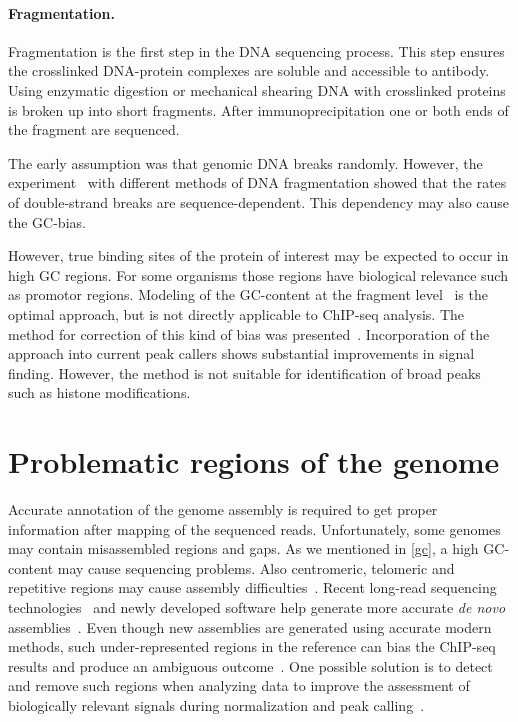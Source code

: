 \paragraph{Fragmentation.}
Fragmentation is the first step in the DNA sequencing process.
This step ensures the crosslinked DNA-protein complexes are soluble and accessible to antibody.
Using enzymatic digestion or mechanical shearing DNA with crosslinked proteins is broken up into short fragments.
After immunoprecipitation one or both ends of the fragment are sequenced.

The early assumption was that genomic DNA breaks randomly.
However, the experiment~\cite{poptsova2014non} with different methods of DNA fragmentation showed that the rates of double-strand breaks are sequence-dependent.
This dependency may also cause the GC-bias. 

However, true binding sites of the protein of interest may be expected to occur in high GC regions.
For some organisms those regions have biological relevance such as promotor regions.
Modeling of the GC-content at the fragment level~\cite{benjamini2012summarizing} is the optimal approach, but is not directly applicable to ChIP-seq analysis.
The method for correction of this kind of bias was presented~\cite{teng2017accounting}.
Incorporation of the approach into current peak callers shows substantial improvements in signal finding.
However, the method is not suitable for identification of broad peaks such as histone modifications.


 \section{Problematic regions of the genome}

 Accurate annotation of the genome assembly is required to get proper information after mapping of the sequenced reads. 
 Unfortunately, some genomes may contain misassembled regions and gaps.
 As we mentioned in \ref{gc}, a high GC-content may cause sequencing problems.
 Also centromeric, telomeric and repetitive regions may cause assembly difficulties~\cite{amemiya2019encode, liao2019current}.
 Recent long-read sequencing technologies~\cite{feng2015nanopore} and newly developed software help generate more accurate \textit{de novo} assemblies~\cite{rice2019new}. 
 Even though new assemblies are generated using accurate modern methods, such under-represented regions in the reference can bias the ChIP-seq results and produce an ambiguous outcome~\cite{carroll2014impact}. 
 One possible solution is to detect and remove such regions when analyzing data to improve the assessment of biologically relevant signals during normalization and peak calling~\cite{amemiya2019encode}. 



